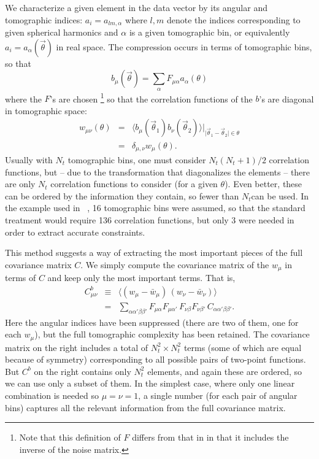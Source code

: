 \documentclass[twocolumn]{\docclass}
\newcommand\be{\begin{equation}}
\newcommand\ee{\end{equation}}
\def\bea{\begin{eqnarray}}
\def\eea{\end{eqnarray}}
\def\svs{\nonumber\\}
\begin{document}
We characterize a given element in the data vector by its angular and tomographic indices: $a_i = a_{lm,\alpha}$ where $l,m$ denote the indices corresponding to given spherical harmonics and $\alpha$ is a given tomographic bin, or equivalently $a_i = a_\alpha(\vec\theta)$ in real space. The compression occurs in terms of tomographic bins, so that 
\be
b_\mu(\vec\theta) = \sum_{\alpha} F_{\mu\alpha} a_\alpha(\theta)
\ee
where the $F$'s are chosen \footnote{Note that this definition of $F$ differs from that in \citep{Alonso:2017hhj} in that it includes the inverse of the noise matrix.} so that the correlation functions of the $b$'s are diagonal in tomographic space:
\bea
w_{\mu\nu}(\theta) &=& \langle b_\mu(\vec\theta_1) b_\nu(\vec\theta_2)\rangle\vert_{\vert\vec\theta_1-\vec\theta_2\vert\in\theta}
\svs
&=& \delta_{\mu,\nu} w_{\mu}(\theta).
\eea
Usually with $N_t$ tomographic bins, one must consider $N_t(N_t+1)/2$ correlation functions, but -- due to the transformation that diagonalizes the elements -- there are only $N_t$ correlation functions to consider (for a given $\theta$). Even better, these can be ordered by the information they contain, so fewer than $N_t$can be used. In the example used in ~\citep{Alonso:2017hhj}, 16 tomographic bins were assumed, so that the standard treatment would require 136 correlation functions, but only 3 were needed in order to extract accurate constraints. 

This method suggests a way of extracting the most important pieces of the full covariance matrix $C$. We simply compute the covariance matrix of the $w_{\mu}$ in terms of $C$ and keep only the most important terms. That is,
\bea
C^b_{\mu\nu} &\equiv& \langle (w_{\mu} -\bar w_\mu)\,(w_{\nu} -\bar w_\nu)\rangle
\svs
&=& \sum_{\alpha\alpha'\beta\beta'} F_{\mu\alpha}F_{\mu\alpha'}\, F_{\nu\beta}F_{\nu\beta'}\, C_{\alpha\alpha'\beta\beta'} .
\eea
Here the angular indices have been suppressed (there are two of them, one for each $w_\mu$), but the full tomographic complexity has been retained. The covariance matrix on the right includes a total of $N_t^2 \times N_t^2$ terms (some of which are equal because of symmetry) corresponding to all possible pairs of two-point functions. But $C^b$ on the right contains only $N_t^2$ elements, and again these are ordered, so we can use only a subset of them. In the simplest case, where only one linear combination is needed so $\mu=\nu=1$, a single number (for each pair of angular bins) captures all the relevant information from the full covariance matrix.
\end{document}

